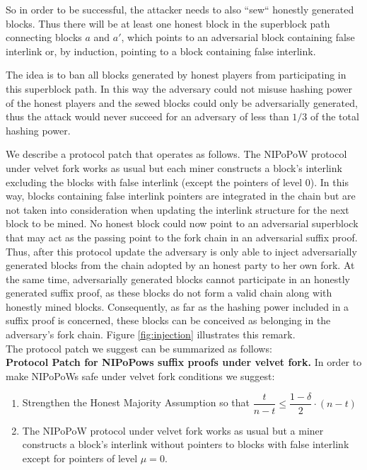 So in order to be successful, the attacker needs to also ``sew`` honestly generated blocks. Thus there will be at least one honest block in the superblock path connecting blocks $a$ and $a'$, which points to an adversarial block containing false interlink or, by induction, pointing to a block containing false interlink.

The idea is to ban all blocks generated by honest players from participating in this superblock path. In this way the adversary could not misuse hashing power of the honest players and the sewed blocks could only be adversarially generated, thus the attack would never succeed for an adversary of less than $1/3$ of the total hashing power. 

We describe a protocol patch that operates as follows. The NIPoPoW protocol under velvet fork works as usual but each miner constructs a block's interlink excluding the blocks with false interlink (except the pointers of level 0). In this way, blocks containing false interlink pointers are integrated in the chain but are not taken into consideration when updating the interlink structure for the next block to be mined. No honest block could now point to an adversarial superblock that may act as the passing point to the fork chain in an adversarial suffix proof. 
Thus, after this protocol update the adversary is only able to inject adversarially generated blocks from the chain adopted by an honest party to her own fork.
At the same time, adversarially generated blocks cannot participate in an honestly generated suffix proof, as these blocks do not form a valid chain along with honestly mined blocks. Consequently, as far as the hashing power included in a suffix proof is concerned, these blocks can be conceived as belonging in the adversary's fork chain. Figure \ref{fig:injection} illustrates this remark.\\
The protocol patch we suggest can be summarized as follows:\\


\textbf{Protocol Patch for NIPoPows suffix proofs under velvet fork.} In order to make NIPoPoWs safe under velvet fork conditions we suggest:
\begin{enumerate}
\item Strengthen the Honest Majority Assumption so that $\dfrac{t}{n-t} \leq \dfrac{1-\delta}{2} \cdot (n-t)$
\item The NIPoPoW protocol under velvet fork works as usual but a miner constructs a block's interlink without pointers to blocks with false interlink except for pointers of level $\mu = 0$.
\end{enumerate}

